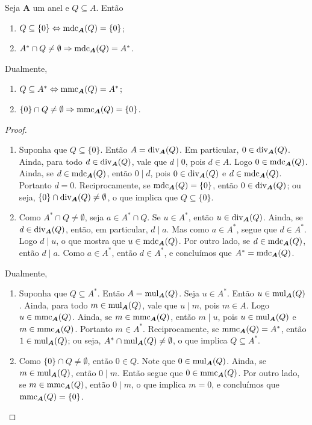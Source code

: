 \begin{prop}
	Seja $\bm A$ um anel e $Q \subseteq A$. Então
	\begin{enumerate}
	\item $Q \subseteq \{0\} \Leftrightarrow \operatorname{mdc}_{\bm A}(Q) = \{0\}$;
	\item $A^* \cap Q \neq \emptyset \Rightarrow \operatorname{mdc}_{\bm A}(Q) = A^*$.
	\end{enumerate}

	Dualmente,
	\begin{enumerate}
	\item $Q \subseteq A^* \Leftrightarrow \operatorname{mmc}_{\bm A}(Q) = A^*$;
	\item $\{0\} \cap Q \neq \emptyset \Rightarrow \operatorname{mmc}_{\bm A}(Q) = \{0\}$.
	\end{enumerate}
\end{prop}
\begin{proof}
	\begin{enumerate}
	\item Suponha que $Q \subseteq \{0\}$. Então $A = \operatorname{div}_{\bm A}(Q)$. Em particular, $0 \in \operatorname{div}_{\bm A}(Q)$. Ainda, para todo $d \in \operatorname{div}_{\bm A}(Q)$, vale que $d \mid 0$, pois $d \in A$. Logo $0 \in \operatorname{mdc}_{\bm A}(Q)$. Ainda, se $d \in \operatorname{mdc}_{\bm A}(Q)$, então $0 \mid d$, pois $0 \in \operatorname{div}_{\bm A}(Q)$ e $d \in \operatorname{mdc}_{\bm A}(Q)$. Portanto $d=0$. Reciprocamente, se $\operatorname{mdc}_{\bm A}(Q)=\{0\}$, então $0 \in \operatorname{div}_{\bm A}(Q)$; ou seja, $\{0\} \cap \operatorname{div}_{\bm A}(Q) \neq \emptyset$, o que implica que $Q \subseteq \{0\}$.

	\item Como $A^* \cap Q \neq \emptyset$, seja $a \in A^* \cap Q$. Se $u \in A^*$, então $u \in \operatorname{div}_{\bm A}(Q)$. Ainda, se $d \in \operatorname{div}_{\bm A}(Q)$, então, em particular, $d \mid a$. Mas como $a \in A^*$, segue que $d \in A^*$. Logo $d \mid u$, o que mostra que $u \in \operatorname{mdc}_{\bm A}(Q)$. Por outro lado, se $d \in \operatorname{mdc}_{\bm A}(Q)$, então $d \mid a$. Como $a \in A^*$, então $d \in A^*$, e concluímos que $A^*=\operatorname{mdc}_{\bm A}(Q)$.
	\end{enumerate}

	Dualmente,
	\begin{enumerate}
	\item Suponha que $Q \subseteq A^*$. Então $A = \operatorname{mul}_{\bm A}(Q)$. Seja $u \in A^*$. Então $u \in \operatorname{mul}_{\bm A}(Q)$. Ainda, para todo $m \in \operatorname{mul}_{\bm A}(Q)$, vale que $u \mid m$, pois $m \in A$. Logo $u \in \operatorname{mmc}_{\bm A}(Q)$. Ainda, se $m \in \operatorname{mmc}_{\bm A}(Q)$, então $m \mid u$, pois $u \in \operatorname{mul}_{\bm A}(Q)$ e $m \in \operatorname{mmc}_{\bm A}(Q)$. Portanto $m \in A^*$. Reciprocamente, se $\operatorname{mmc}_{\bm A}(Q)=A^*$, então $1 \in \operatorname{mul}_{\bm A}(Q)$; ou seja, $A^* \cap \operatorname{mul}_{\bm A}(Q) \neq \emptyset$, o que implica $Q \subseteq A^*$.

	\item Como $\{0\} \cap Q \neq \emptyset$, então $0 \in Q$. Note que $0 \in \operatorname{mul}_{\bm A}(Q)$. Ainda, se $m \in \operatorname{mul}_{\bm A}(Q)$, então $0 \mid m$. Então segue que $0 \in \operatorname{mmc}_{\bm A}(Q)$. Por outro lado, se $m \in \operatorname{mmc}_{\bm A}(Q)$, então $0 \mid m$, o que implica $m=0$, e concluímos que $\operatorname{mmc}_{\bm A}(Q) = \{0\}$.
	\end{enumerate}
\end{proof}



